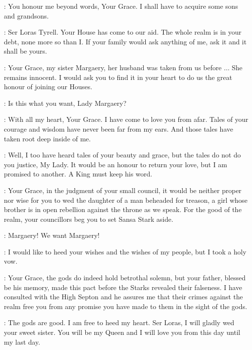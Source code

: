 \LITTLEFINGER: You honour me beyond words, Your Grace. I shall have to acquire some sons and grandsons. 


\JOFFREY: Ser Loras Tyrell. Your House has come to our aid. The whole realm is in your debt, none more so than I. If your family would ask anything of me, ask it and it shall be yours. 

\LORAS: Your Grace, my sister Margaery, her husband was taken from us before $\ldots$ She remains innocent. I would ask you to find it in your heart to do us the great honour of joining our Houses. 

\JOFFREY: Is this what you want, Lady Margaery?

\MARGAERY: With all my heart, Your Grace. I have come to love you from afar. Tales of your courage and wisdom have never been far from my ears. And those tales have taken root deep inside of me. 

\JOFFREY: Well, I too have heard tales of your beauty and grace, but the tales do not do you justice, My Lady. It would be an honour to return your love, but I am promised to another. A King must keep his word. 

\CERSEI: Your Grace, in the judgment of your small council, it would be neither proper nor wise for you to wed the daughter of a man beheaded for treason, a girl whose brother is in open rebellion against the throne as we speak. For the good of the realm, your councillors beg you to set Sansa Stark aside. 

\CROWD:  Margaery! We want Margaery! 

\JOFFREY: I would like to heed your wishes and the wishes of my people, but I took a holy vow. 

\PYCELLE: Your Grace, the gods do indeed hold betrothal solemn, but your father, blessed be his memory, made this pact before the Starks revealed their falseness. I have consulted with the High Septon and he assures me that their crimes against the realm free you from any promise you have made to them in the sight of the gods. 

\JOFFREY:  The gods are good. I am free to heed my heart. Ser Loras, I will gladly wed your sweet sister.  You will be my Queen and I will love you from this day until my last day. 


